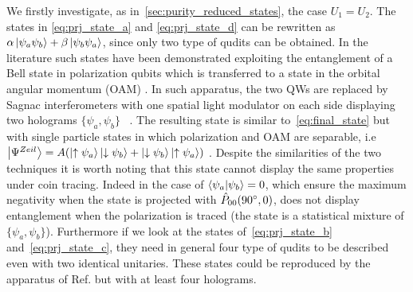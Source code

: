 \documentclass[
aps, pra, authorblock, superscriptaddress, twocolumn,
	10pt]{revtex4-1}
\newcommand{\parTitle}[1]{\noindent{\color{Mahogany}(\emph{#1})}}
\begin{document}
\parTitle{Case with same QW on both sides}
We firstly investigate, as in~\cref{sec:purity_reduced_states}, the case $U_1 = U_2$. The states in \cref{eq:prj_state_a} and  \cref{eq:prj_state_d} can be rewritten as $\alpha \ket{\psi_a \psi_b} + \beta \ket{\psi_b \psi_a}$, since only two type of qudits can be obtained.
In the literature such states have been demonstrated exploiting the entanglement of a Bell state in polarization qubits which is transferred to a state in the orbital angular momentum (OAM) .
In such apparatus, the two QWs are replaced by Sagnac interferometers with one spatial light modulator on each side displaying two holograms $\{\psi_a, \psi_b\}$~\cite{fickler2012quantum} . The resulting state is similar to~\cref{eq:final_state} but with single particle states in which polarization and OAM are separable, i.e $\ket{\Psi^{Zeil}}=A(\ket{\uparrow \psi_a}\ket{\downarrow \psi_b} +\ket{\downarrow \psi_b} \ket{\uparrow \psi_a})$ .
Despite the similarities of the two techniques  it is worth noting that this state cannot display the same properties under coin tracing.
Indeed in the case of $\braket{\psi_a}{\psi_b}=0$, which ensure the maximum negativity when the state is projected with $\hat{P}_{00}(90\degree,0)$, does not display entanglement when the polarization is traced (the state is a statistical mixture of $\{\psi_a, \psi_b\}$).
Furthermore if we look at the states of~\cref{eq:prj_state_b} and~\cref{eq:prj_state_c}, they need in general four type of qudits to be described even with two identical unitaries. These states could be reproduced by the apparatus of Ref. \cite{fickler2012quantum} but with at least four holograms.
\end{document}
